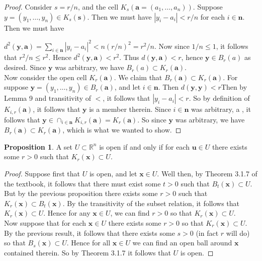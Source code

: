 \documentclass[11pt]{article}
\newcommand{\R}{\mathbb{R}}
\theoremstyle{definition}
\newtheorem{proposition}{Proposition}
\begin{document}
\begin{proof}
Consider $s = r/n$, and the cell $K_s(\mathbf{a} = (a_1,\dots,a_n))$. Suppose $y = (y_1,\dots,y_n)\in K_s(\mathbf{s})$. Then we must have $|y_i-a_i| < r/n$ for each $i\in \mathbf{n}$. Then we must have 

$d^2(\mathbf{y}, \mathbf{a}) = \sum_{i\in \mathbf{n}}|y_i - a_i|^2  < n(r/n)^2 = r^2/n$. Now since $1/n \le 1$, it follows that $r^2/n \le r^2$. Hence $d^2(\mathbf{y}, \mathbf{a}) < r^2$. Thus $d(\mathbf{y},\mathbf{a}) < r$, hence $\mathbf{y}\in B_r(a)$ as desired. Since $\mathbf{y}$ was arbitrary, we have $B_r(a) \subset K_r(\mathbf{a})$.\\
 
 Now consider the open cell $K_r(\mathbf{a})$. We claim that $B_r(\mathbf{a}) \subset K_r(\mathbf{a})$. For suppose $ \mathbf{y} = (y_1,\dots,y_n)\in B_r(\mathbf{a})$, and let $i\in \mathbf{n}$. Then $ d(\mathbf{y},\mathbf{y}) < r $Then by Lemma 9 and transitivity of $<$, it follows that $|y_i - a_i| < r$. So by definition of $K_{i,r}(\mathbf{a})$, it follows that $\mathbf{y}$ is a member therein. Since $i\in \mathbf{n}$ was arbitrary, a , it follows that $\mathbf{y}\in \cap_{i\in \mathbf{n}}K_{i,r}(\mathbf{a}) = K_r(\mathbf{a})$. So since $\mathbf{y}$ was arbitrary, we have $ B_r(\mathbf{a}) \subset K_r(\mathbf{a}) $, which is what we wanted to show.
\end{proof}

\begin{proposition}
A set $U\subset \R^n$ is open if and only if for each $\mathbf{u}\in U$ there exists some $r>0$ such that $K_r(\mathbf{x})\subset U$.
\end{proposition}

\begin{proof}
Suppose first that $U$ is open, and let $\mathbf{x}\in U$. Well then, by Theorem 3.1.7 of the textbook, it follows that there must exist some $t>0$ such that $B_t(\mathbf{x})\subset U$. But by the previous proposition there exists some $r>0$ such that $K_r(\mathbf{x})\subset B_t(\mathbf{x})$. By the transitivity of the subset relation, it follows that $K_r(\mathbf{x})\subset U$. Hence for any $\mathbf{x}\in U$, we can find $r>0$ so that $K_r(\mathbf{x})\subset U$.\\
 
Now suppose that for each $\mathbf{x}\in U$ there exists some $r>0$ so that $K_r(\mathbf{x})\subset U$. By the previous result, it follows that there exists some $s> 0$ (in fact $r$ will do) so that $B_s(\mathbf{x})\subset U$. Hence for all $\mathbf{x}\in U$ we can find an open ball around $\mathbf{x}$ contained therein. So by Theorem 3.1.7 it follows that $U$ is open.
\end{proof}
\end{document}
